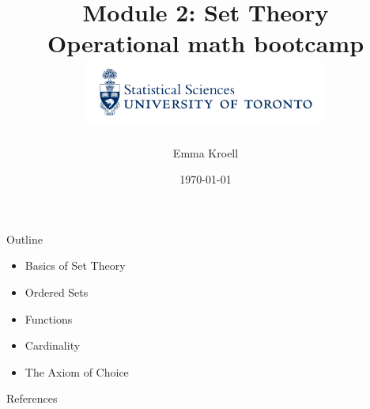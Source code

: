\documentclass [aspectratio=169]{beamer}
\title[]{Module 2: Set Theory \\ {\large Operational math bootcamp}\\ \includegraphics[width=8cm]{dept_logo.png}\vspace{-1em}}
\author[]{Emma Kroell}
\institute[]{University of Toronto}
\date{\today}
\begin{document}
{
\begin{frame}
    \titlepage
\end{frame}
}

\begin{frame}{Outline}
    \begin{itemize}
    	\item Basics of Set Theory
	\item Ordered Sets
        \item Functions
        \item Cardinality
        \item The Axiom of Choice
    \end{itemize}
\end{frame}



\begin{frame}{References}


\end{frame}
\end{document}

